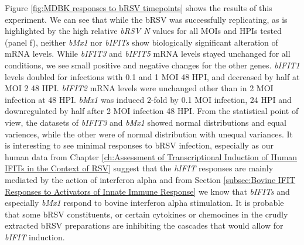Figure \ref{fig:MDBK responses to bRSV timepoints} shows the results of this experiment. We can see that while the bRSV was successfully replicating, as is highlighted by the high relative \textit{bRSV N} values for all MOIs and HPIs tested (panel f), neither \textit{bMx1} nor \textit{bIFITs} show biologically significant alteration of mRNA levels. While \textit{bIFIT3}  and \textit{bIFIT5} mRNA levels stayed unchanged for all conditions, we see small positive and negative changes for the other genes. \textit{bIFIT1} levels doubled for infections with 0.1 and 1 MOI 48 HPI, and decreased by half at MOI 2 48 HPI. \textit{bIFIT2} mRNA levels were unchanged other than in 2 MOI infection at 48 HPI. \textit{bMx1} was induced 2-fold by 0.1 MOI infection, 24 HPI and downregulated by half after 2 MOI infection 48 HPI. From the statistical point of view, the datasets of \textit{bIFIT3} and \textit{bMx1} showed normal distributions and equal variences, while the other were of normal distribution with unequal variances. It is interesting to see minimal responses to bRSV infection, especially as our human data from Chapter \ref{ch:Assessment of Transcriptional Induction of Human IFITs in the Context of RSV} suggest that the \textit{hIFIT} responses are mainly mediated by the action of interferon alpha and from Section \ref{subsec:Bovine IFIT Responses to Activators of Innate Immune Response} we know that \textit{bIFITs} and especially \textit{bMx1} respond to bovine interferon alpha stimulation. It is probable that some bRSV constituents, or certain cytokines or chemocines in the crudly extracted bRSV preparations are inhibiting the cascades that would allow for \textit{bIFIT} induction.

